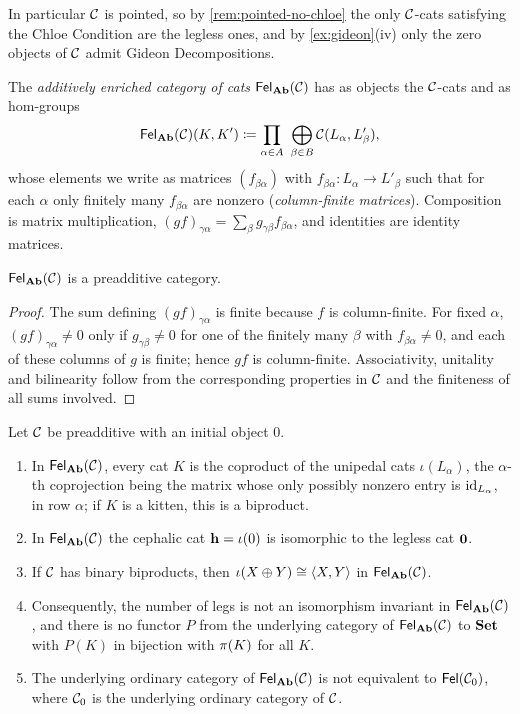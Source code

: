 In particular $\mathcal{C}$ is pointed, so by \cref{rem:pointed-no-chloe} the only
$\mathcal{C}$-cats satisfying the Chloe Condition are the legless ones, and by
\cref{ex:gideon}(iv) only the zero objects of $\mathcal{C}$ admit Gideon
Decompositions.


\begin{definition}\label{def:Fel-Ab}
The \emph{additively enriched category of cats} $\mathsf{Fel}_{\mathbf{Ab}}(\mathcal{C})$ has as
objects the $\mathcal{C}$-cats and as hom-groups
\[
\Fel_\Ab(\cC)(K,K')\defeq\prod_{\alpha\in A}\ \bigoplus_{\beta\in B}\cC(L_\alpha,L'_\beta),
\]
whose elements we write as matrices $(f_{\beta\alpha})$ with
$f_{\beta\alpha}\colon L_\alpha\to L'_\beta$ such that for each $\alpha$ only
finitely many $f_{\beta\alpha}$ are nonzero (\emph{column-finite matrices}).
Composition is matrix multiplication, $(gf)_{\gamma\alpha}=\sum_\beta g_{\gamma\beta}f_{\beta\alpha}$,
and identities are identity matrices.
\end{definition}

\begin{lemma}\label{lem:Fel-Ab-category}
$\mathsf{Fel}_{\mathbf{Ab}}(\mathcal{C})$ is a preadditive category.
\end{lemma}

\begin{proof}
The sum defining $(gf)_{\gamma\alpha}$ is finite because $f$ is column-finite.
For fixed $\alpha$, $(gf)_{\gamma\alpha}\neq0$ only if $g_{\gamma\beta}\neq0$ for
one of the finitely many $\beta$ with $f_{\beta\alpha}\neq0$, and each of these
columns of $g$ is finite; hence $gf$ is column-finite. Associativity,
unitality and bilinearity follow from the corresponding properties in $\mathcal{C}$
and the finiteness of all sums involved.
\end{proof}

\begin{theorem}\label{thm:Ab-collapse}
Let $\mathcal{C}$ be preadditive with an initial object $0$.
\begin{enumerate}
\item In $\mathsf{Fel}_{\mathbf{Ab}}(\mathcal{C})$, every cat $K$ is the coproduct of the unipedal cats
  $\iota(L_\alpha)$, the $\alpha$-th coprojection being the matrix whose only
  possibly nonzero entry is $\mathrm{id}_{L_\alpha}$, in row $\alpha$; if $K$ is a kitten,
  this is a biproduct.
\item In $\mathsf{Fel}_{\mathbf{Ab}}(\mathcal{C})$ the cephalic cat $\mathbf{h}=\iota(0)$ is isomorphic to
  the legless cat $\mathbf{0}$.
\item If $\mathcal{C}$ has binary biproducts, then $\iota(X\oplus Y)\cong\langle X,Y\rangle$ in
  $\mathsf{Fel}_{\mathbf{Ab}}(\mathcal{C})$.
\item Consequently, the number of legs is not an isomorphism invariant in
  $\mathsf{Fel}_{\mathbf{Ab}}(\mathcal{C})$, and there is no functor $P$ from the underlying category of
  $\mathsf{Fel}_{\mathbf{Ab}}(\mathcal{C})$ to $\mathbf{Set}$ with $P(K)$ in bijection with $\pi(K)$ for all
  $K$.
\item The underlying ordinary category of $\mathsf{Fel}_{\mathbf{Ab}}(\mathcal{C})$ is not equivalent to
  $\mathsf{Fel}(\mathcal{C}_0)$, where $\mathcal{C}_0$ is the underlying ordinary category of $\mathcal{C}$.
\end{enumerate}
\end{theorem}

